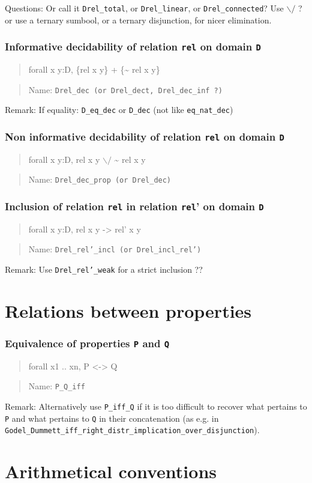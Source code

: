 \documentclass[a4paper]{article}
\newcommand\itemrule[3]{
\subsubsection{#1}
\begin{quote}
\begin{tt}
#3
\end{tt}
\end{quote}
\begin{quote}
Name: \texttt{#2}
\end{quote}}
\newcommand\name[1]{\texttt{#1}}
\newcommand\D{\texttt{D}}
\newcommand\rel{\texttt{rel}}
\begin{document}
  Questions: Or call it \name{Drel\_total}, or \name{Drel\_linear}, or
  \name{Drel\_connected}? Use
  $\backslash/$ ? or use a ternary sumbool, or a ternary disjunction,
  for nicer elimination.

\itemrule{Informative decidability of relation {\rel} on domain {\D}}{Drel\_dec (or Drel\_dect, Drel\_dec\_inf ?)}
{forall x y:D, \{rel x y\} + \{\~{} rel x y\}}

  Remark: If equality: \name{D\_eq\_dec} or \name{D\_dec} (not like
  \name{eq\_nat\_dec})

\itemrule{Non informative decidability of relation {\rel} on domain {\D}}{Drel\_dec\_prop (or Drel\_dec)}
{forall x y:D, rel x y $\backslash/$ \~{} rel x y}

\itemrule{Inclusion of relation {\rel} in relation {\rel}' on domain {\D}}{Drel\_rel'\_incl (or Drel\_incl\_rel')}
{forall x y:D, rel x y -> rel' x y}

  Remark: Use \name{Drel\_rel'\_weak} for a strict inclusion ??

\section{Relations between properties}

\itemrule{Equivalence of properties \texttt{P} and \texttt{Q}}{P\_Q\_iff}
{forall x1 .. xn, P <-> Q}

  Remark: Alternatively use \name{P\_iff\_Q} if it is too difficult to
  recover what pertains to \texttt{P} and what pertains to \texttt{Q}
  in their concatenation (as e.g. in
  \texttt{Godel\_Dummett\_iff\_right\_distr\_implication\_over\_disjunction}).

\section{Arithmetical conventions}
\end{document}
